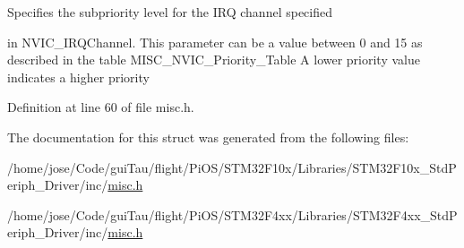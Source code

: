 \begin{DoxyVerb}         Specifies the subpriority level for the IRQ channel specified
\end{DoxyVerb}
 in N\-V\-I\-C\-\_\-\-I\-R\-Q\-Channel. This parameter can be a value between 0 and 15 as described in the table M\-I\-S\-C\-\_\-\-N\-V\-I\-C\-\_\-\-Priority\-\_\-\-Table A lower priority value indicates a higher priority 

Definition at line 60 of file misc.\-h.



The documentation for this struct was generated from the following files\-:\begin{DoxyCompactItemize}
\item 
/home/jose/\-Code/gui\-Tau/flight/\-Pi\-O\-S/\-S\-T\-M32\-F10x/\-Libraries/\-S\-T\-M32\-F10x\-\_\-\-Std\-Periph\-\_\-\-Driver/inc/\hyperlink{_s_t_m32_f10x_2_libraries_2_s_t_m32_f10x___std_periph___driver_2inc_2misc_8h}{misc.\-h}\item 
/home/jose/\-Code/gui\-Tau/flight/\-Pi\-O\-S/\-S\-T\-M32\-F4xx/\-Libraries/\-S\-T\-M32\-F4xx\-\_\-\-Std\-Periph\-\_\-\-Driver/inc/\hyperlink{_s_t_m32_f4xx_2_libraries_2_s_t_m32_f4xx___std_periph___driver_2inc_2misc_8h}{misc.\-h}\end{DoxyCompactItemize}
